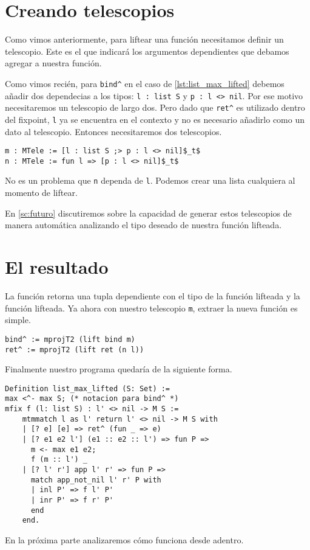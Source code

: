 \section{Creando telescopios}

Como vimos anteriormente, para liftear una función necesitamos definir un telescopio. Este es el que indicará los argumentos dependientes que debamos agregar a nuestra función.

Como vimos recién, para \lstinline{bind^} en el caso de \ref{lst:list_max_lifted} debemos añadir dos dependecias a los tipos: \lstinline{l : list S} y \lstinline{p : l <> nil}.
Por ese motivo necesitaremos un telescopio de largo dos.
Pero dado que \lstinline{ret^} es utilizado dentro del fixpoint, \lstinline{l} ya se encuentra en el contexto y no es necesario añadirlo como un dato al telescopio. Entonces necesitaremos dos telescopios.

\begin{lstlisting}[frame=tb,caption={Telescopio para \lstinline{list_max}},label=lst:list_max_tele]
m : MTele := [l : list S ;> p : l <> nil]$_t$
n : MTele := fun l => [p : l <> nil]$_t$
\end{lstlisting}

No es un problema que \lstinline{n} dependa de \lstinline{l}. Podemos crear una lista cualquiera al momento de liftear.

En \ref{sc:futuro} discutiremos sobre la capacidad de generar estos telescopios de manera automática analizando el tipo deseado de nuestra función lifteada.

\section{El resultado}

La función \lift retorna una tupla dependiente con el tipo de la función lifteada y la función lifteada. Ya ahora con nuestro telescopio \lstinline{m}, extraer la nueva función es simple.

\begin{lstlisting}[float=h,frame=tb,caption={Lifteando \lstinline{ret} y \lstinline{bind}},label=lst:lift1]
bind^ := mprojT2 (lift bind m)
ret^ := mprojT2 (lift ret (n l))
\end{lstlisting}

Finalmente nuestro programa quedaría de la siguiente forma.

\begin{lstlisting}[float=h,frame=tb,caption={Lifteando \lstinline{ret} y \lstinline{bind}},label=lst:lift1]
Definition list_max_lifted (S: Set) :=
max <^- max S; (* notacion para bind^ *)
mfix f (l: list S) : l' <> nil -> M S :=
    mtmmatch l as l' return l' <> nil -> M S with
    | [? e] [e] => ret^ (fun _ => e)
    | [? e1 e2 l'] (e1 :: e2 :: l') => fun P =>
      m <- max e1 e2;
      f (m :: l') _
    | [? l' r'] app l' r' => fun P =>
      match app_not_nil l' r' P with
      | inl P' => f l' P'
      | inr P' => f r' P'
      end
    end.
\end{lstlisting}

En la próxima parte analizaremos cómo funciona \lift desde adentro.